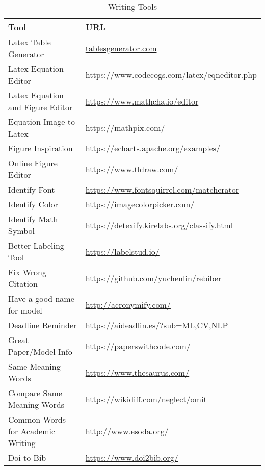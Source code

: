 \begin{table}
	\caption{Writing Tools}\label{tab:writing_tools}
	\begin{tabular}{ll}
		\toprule
		\textbf{Tool}                     & \textbf{URL}                                       \\
		\midrule
		Latex Table Generator             & \url{tablesgenerator.com}                          \\
		Latex Equation Editor             & \url{https://www.codecogs.com/latex/eqneditor.php} \\
		Latex Equation and Figure Editor  & \url{https://www.mathcha.io/editor}                \\
		Equation Image to Latex           & \url{https://mathpix.com/}                         \\
		Figure Inspiration                & \url{https://echarts.apache.org/examples/}         \\
		Online Figure Editor              & \url{https://www.tldraw.com/}                      \\
		Identify Font                     & \url{https://www.fontsquirrel.com/matcherator}     \\
		Identify Color                    & \url{https://imagecolorpicker.com/}                \\
		Identify Math Symbol              & \url{https://detexify.kirelabs.org/classify.html}  \\
		Better Labeling Tool              & \url{https://labelstud.io/}                        \\
		Fix Wrong Citation                & \url{https://github.com/yuchenlin/rebiber}         \\
		Have a good name for model        & \url{http://acronymify.com/}                       \\
		Deadline Reminder                 & \url{https://aideadlin.es/?sub=ML,CV,NLP}          \\
		Great Paper/Model Info            & \url{https://paperswithcode.com/}                  \\
		Same Meaning Words                & \url{https://www.thesaurus.com/}                   \\
		Compare Same Meaning Words        & \url{https://wikidiff.com/neglect/omit}            \\
		Common Words for Academic Writing & \url{http://www.esoda.org/}                        \\
		Doi to Bib                        & \url{https://www.doi2bib.org/}                     \\

\end{tabular}
\end{table}
